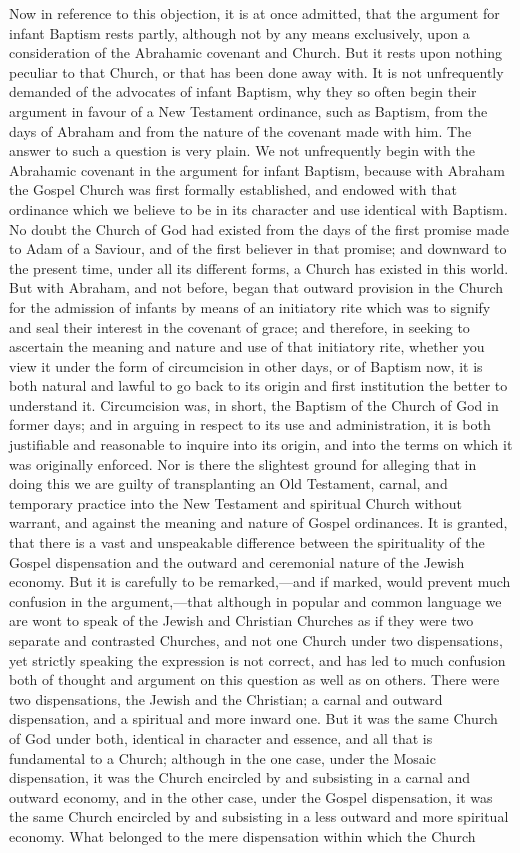 \documentclass[
  english,
]{book}
\begin{document}
Now in reference to this objection, it is at once admitted, that the argument for infant Baptism rests partly, although not by any means exclusively, upon a consideration of the Abrahamic covenant and Church. But it rests upon nothing peculiar to that Church, or that has been done away with. It is not unfrequently demanded of the advocates of infant Baptism, why they so often begin their argument in favour of a New Testament ordinance, such as Baptism, from the days of Abraham and from the nature of the covenant made with him. The answer to such a question is very plain. We not unfrequently begin with the Abrahamic covenant in the argument for infant Baptism, because with Abraham the Gospel Church was first formally established, and endowed with that ordinance which we believe to be in its character and use identical with Baptism. No doubt the Church of God had existed from the days of the first promise made to Adam of a Saviour, and of the first believer in that promise; and downward to the present time, under all its different forms, a Church has existed in this world. But with Abraham, and not before, began that outward provision in the Church for the admission of infants by means of an initiatory rite which was to signify and seal their interest in the covenant of grace; and therefore, in seeking to ascertain the meaning and nature and use of that initiatory rite, whether you view it under the form of circumcision in other days, or of Baptism now, it is both natural and lawful to go back to its origin and first institution the better to understand it. Circumcision was, in short, the Baptism of the Church of God in former days; and in arguing in respect to its use and administration, it is both justifiable and reasonable to inquire into its origin, and into the terms on which it was originally enforced. Nor is there the slightest ground for alleging that in doing this we are guilty of transplanting an Old Testament, carnal, and temporary practice into the New Testament and spiritual Church without warrant, and against the meaning and nature of Gospel ordinances. It is granted, that there is a vast and unspeakable difference between the spirituality of the Gospel dispensation and the outward and ceremonial nature of the Jewish economy. But it is carefully to be remarked,---and if marked, would prevent much confusion in the argument,---that although in popular and common language we are wont to speak of the Jewish and Christian Churches as if they were two separate and contrasted Churches, and not one Church under two dispensations, yet strictly speaking the expression is not correct, and has led to much confusion both of thought and argument on this question as well as on others. There were two dispensations, the Jewish and the Christian; a carnal and outward dispensation, and a spiritual and more inward one. But it was the same Church of God under both, identical in character and essence, and all that is fundamental to a Church; although in the one case, under the Mosaic dispensation, it was the Church encircled by and subsisting in a carnal and outward economy, and in the other case, under the Gospel dispensation, it was the same Church encircled by and subsisting in a less outward and more spiritual economy. What belonged to the mere dispensation within which the Church 
\end{document}
